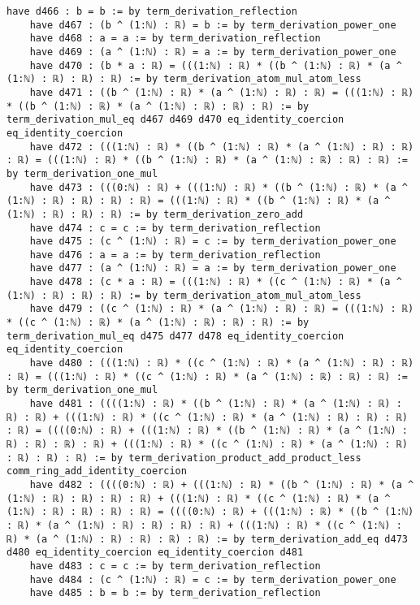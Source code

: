 \documentclass{article}
\begin{document}
\begin{tcolorbox}[colback=white!10, width=\linewidth]
\begin{lstlisting}[language=Lean4]
    have d466 : b = b := by term_derivation_reflection
    have d467 : (b ^ (1:ℕ) : ℝ) = b := by term_derivation_power_one
    have d468 : a = a := by term_derivation_reflection
    have d469 : (a ^ (1:ℕ) : ℝ) = a := by term_derivation_power_one
    have d470 : (b * a : ℝ) = (((1:ℕ) : ℝ) * ((b ^ (1:ℕ) : ℝ) * (a ^ (1:ℕ) : ℝ) : ℝ) : ℝ) := by term_derivation_atom_mul_atom_less
    have d471 : ((b ^ (1:ℕ) : ℝ) * (a ^ (1:ℕ) : ℝ) : ℝ) = (((1:ℕ) : ℝ) * ((b ^ (1:ℕ) : ℝ) * (a ^ (1:ℕ) : ℝ) : ℝ) : ℝ) := by term_derivation_mul_eq d467 d469 d470 eq_identity_coercion eq_identity_coercion
    have d472 : (((1:ℕ) : ℝ) * ((b ^ (1:ℕ) : ℝ) * (a ^ (1:ℕ) : ℝ) : ℝ) : ℝ) = (((1:ℕ) : ℝ) * ((b ^ (1:ℕ) : ℝ) * (a ^ (1:ℕ) : ℝ) : ℝ) : ℝ) := by term_derivation_one_mul
    have d473 : (((0:ℕ) : ℝ) + (((1:ℕ) : ℝ) * ((b ^ (1:ℕ) : ℝ) * (a ^ (1:ℕ) : ℝ) : ℝ) : ℝ) : ℝ) = (((1:ℕ) : ℝ) * ((b ^ (1:ℕ) : ℝ) * (a ^ (1:ℕ) : ℝ) : ℝ) : ℝ) := by term_derivation_zero_add
    have d474 : c = c := by term_derivation_reflection
    have d475 : (c ^ (1:ℕ) : ℝ) = c := by term_derivation_power_one
    have d476 : a = a := by term_derivation_reflection
    have d477 : (a ^ (1:ℕ) : ℝ) = a := by term_derivation_power_one
    have d478 : (c * a : ℝ) = (((1:ℕ) : ℝ) * ((c ^ (1:ℕ) : ℝ) * (a ^ (1:ℕ) : ℝ) : ℝ) : ℝ) := by term_derivation_atom_mul_atom_less
    have d479 : ((c ^ (1:ℕ) : ℝ) * (a ^ (1:ℕ) : ℝ) : ℝ) = (((1:ℕ) : ℝ) * ((c ^ (1:ℕ) : ℝ) * (a ^ (1:ℕ) : ℝ) : ℝ) : ℝ) := by term_derivation_mul_eq d475 d477 d478 eq_identity_coercion eq_identity_coercion
    have d480 : (((1:ℕ) : ℝ) * ((c ^ (1:ℕ) : ℝ) * (a ^ (1:ℕ) : ℝ) : ℝ) : ℝ) = (((1:ℕ) : ℝ) * ((c ^ (1:ℕ) : ℝ) * (a ^ (1:ℕ) : ℝ) : ℝ) : ℝ) := by term_derivation_one_mul
    have d481 : ((((1:ℕ) : ℝ) * ((b ^ (1:ℕ) : ℝ) * (a ^ (1:ℕ) : ℝ) : ℝ) : ℝ) + (((1:ℕ) : ℝ) * ((c ^ (1:ℕ) : ℝ) * (a ^ (1:ℕ) : ℝ) : ℝ) : ℝ) : ℝ) = ((((0:ℕ) : ℝ) + (((1:ℕ) : ℝ) * ((b ^ (1:ℕ) : ℝ) * (a ^ (1:ℕ) : ℝ) : ℝ) : ℝ) : ℝ) + (((1:ℕ) : ℝ) * ((c ^ (1:ℕ) : ℝ) * (a ^ (1:ℕ) : ℝ) : ℝ) : ℝ) : ℝ) := by term_derivation_product_add_product_less comm_ring_add_identity_coercion
    have d482 : ((((0:ℕ) : ℝ) + (((1:ℕ) : ℝ) * ((b ^ (1:ℕ) : ℝ) * (a ^ (1:ℕ) : ℝ) : ℝ) : ℝ) : ℝ) + (((1:ℕ) : ℝ) * ((c ^ (1:ℕ) : ℝ) * (a ^ (1:ℕ) : ℝ) : ℝ) : ℝ) : ℝ) = ((((0:ℕ) : ℝ) + (((1:ℕ) : ℝ) * ((b ^ (1:ℕ) : ℝ) * (a ^ (1:ℕ) : ℝ) : ℝ) : ℝ) : ℝ) + (((1:ℕ) : ℝ) * ((c ^ (1:ℕ) : ℝ) * (a ^ (1:ℕ) : ℝ) : ℝ) : ℝ) : ℝ) := by term_derivation_add_eq d473 d480 eq_identity_coercion eq_identity_coercion d481
    have d483 : c = c := by term_derivation_reflection
    have d484 : (c ^ (1:ℕ) : ℝ) = c := by term_derivation_power_one
    have d485 : b = b := by term_derivation_reflection

\end{lstlisting}
\end{tcolorbox}
\end{document}
